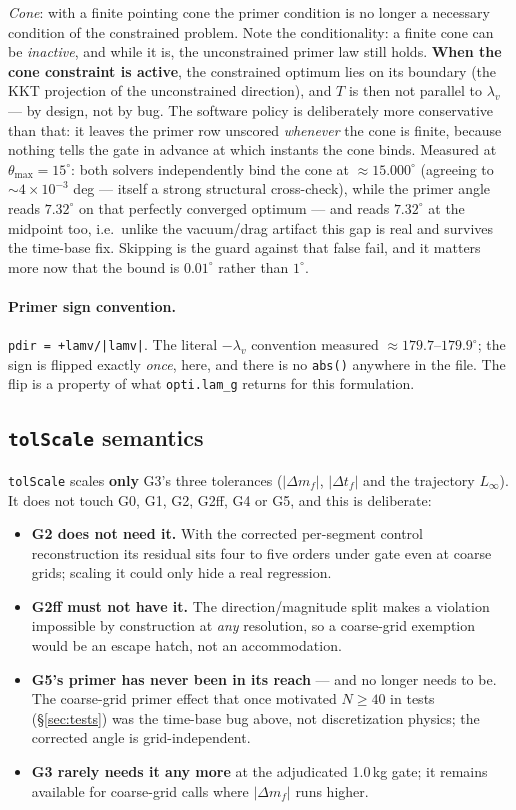 \documentclass[11pt]{article}
\begin{document}
\emph{Cone}: with a finite pointing cone the primer condition is no longer
a necessary condition of the constrained problem. Note the conditionality:
a finite cone can be \emph{inactive}, and while it is, the unconstrained
primer law still holds. \textbf{When the cone constraint is active}, the
constrained optimum lies on its boundary (the KKT projection of the
unconstrained direction), and $T$ is then not parallel to $\lambda_v$ ---
by design, not by bug. The software policy is deliberately more
conservative than that: it leaves the primer row unscored \emph{whenever}
the cone is finite, because nothing tells the gate in advance at which
instants the cone binds. Measured at
$\theta_{\max}=15^\circ$: both solvers independently bind the cone at
$\approx15.000^\circ$ (agreeing to $\sim4\times10^{-3}$ deg --- itself a
strong structural cross-check), while the primer angle reads $7.32^\circ$ on
that perfectly converged optimum --- and reads $7.32^\circ$ at the midpoint
too, i.e.\ unlike the vacuum/drag artifact this gap is real and survives the
time-base fix. Skipping is the guard against that false fail, and it matters
more now that the bound is $0.01^\circ$ rather than $1^\circ$.

\paragraph{Primer sign convention.} \texttt{pdir = +lamv/|lamv|}. The
literal $-\lambda_v$ convention measured $\approx179.7$--$179.9^\circ$; the
sign is flipped exactly \emph{once}, here, and there is no \texttt{abs()}
anywhere in the file. The flip is a property of what
\texttt{opti.lam\_g} returns for this formulation.

\subsection{\texttt{tolScale} semantics}

\texttt{tolScale} scales \textbf{only} G3's three tolerances ($|\Delta
m_f|$, $|\Delta t_f|$ and the trajectory $L_\infty$). It does not touch G0,
G1, G2, G2ff, G4 or G5, and this is deliberate:

\begin{itemize}
\item \textbf{G2 does not need it.} With the corrected per-segment control
reconstruction its residual sits four to five orders under gate even at
coarse grids; scaling it could only hide a real regression.
\item \textbf{G2ff must not have it.} The direction/magnitude split makes a
violation impossible by construction at \emph{any} resolution, so a
coarse-grid exemption would be an escape hatch, not an accommodation.
\item \textbf{G5's primer has never been in its reach} --- and no longer
needs to be. The coarse-grid primer effect that once motivated $N\ge40$ in
tests (\S\ref{sec:tests}) was the time-base bug above, not discretization
physics; the corrected angle is grid-independent.
\item \textbf{G3 rarely needs it any more} at the adjudicated 1.0\,kg gate;
it remains available for coarse-grid calls where $|\Delta m_f|$ runs higher.
\end{itemize}
\end{document}
